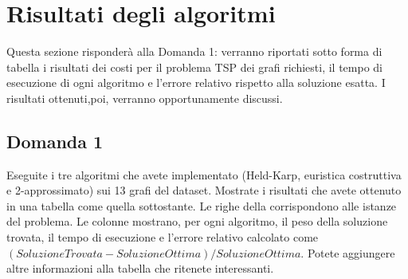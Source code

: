 \section{Risultati degli algoritmi}
Questa sezione risponderà alla Domanda 1: verranno riportati sotto forma di tabella i risultati dei costi per il problema TSP dei grafi richiesti, il tempo di esecuzione di ogni algoritmo e l'errore relativo rispetto alla soluzione esatta. I risultati ottenuti,poi, verranno opportunamente discussi.

\subsection{Domanda 1}
Eseguite i tre algoritmi che avete implementato (Held-Karp, euristica costruttiva e 2-approssimato) sui 13 grafi del dataset. Mostrate i risultati che avete ottenuto in una tabella come quella sottostante. Le righe della corrispondono alle istanze del problema. Le colonne mostrano, per ogni algoritmo, il peso della soluzione trovata, il tempo di esecuzione e l'errore relativo calcolato come $(SoluzioneTrovata - SoluzioneOttima)/SoluzioneOttima$. Potete aggiungere altre informazioni alla tabella che ritenete interessanti. 
